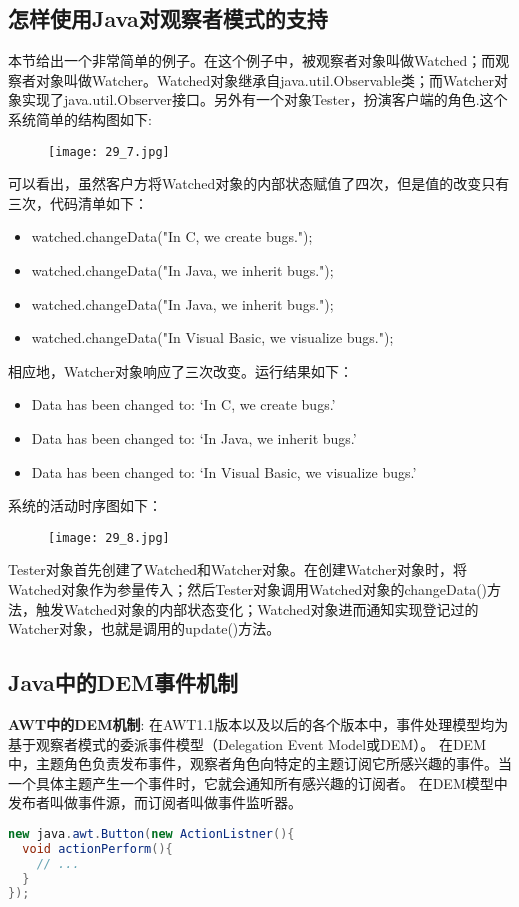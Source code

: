 \documentclass[../main.tex]{subfiles}
\begin{document}
\subsection{怎样使用Java对观察者模式的支持}
本节给出一个非常简单的例子。在这个例子中，被观察者对象叫做Watched；而观察者对象叫做Watcher。Watched对象继承自java.util.Observable类；而Watcher对象实现了java.util.Observer接口。另外有一个对象Tester，扮演客户端的角色.这个系统简单的结构图如下:
%
\begin{figure}[H]
  \texttt{[image: 29\_7.jpg]}
\end{figure}
%



%
可以看出，虽然客户方将Watched对象的内部状态赋值了四次，但是值的改变只有三次，代码清单如下：
%
\begin{itemize}
  \item watched.changeData("In C, we create bugs.");
  \item watched.changeData("In Java, we inherit bugs.");
  \item watched.changeData("In Java, we inherit bugs.");
  \item watched.changeData("In Visual Basic, we visualize bugs.");
\end{itemize}
%
相应地，Watcher对象响应了三次改变。运行结果如下：
%
\begin{itemize}
  \item Data has been changed to: ‘In C, we create bugs.’
  \item Data has been changed to: ‘In Java, we inherit bugs.’
  \item Data has been changed to: ‘In Visual Basic, we visualize bugs.’
\end{itemize}
%
系统的活动时序图如下：
%
\begin{figure}[H]
  \texttt{[image: 29\_8.jpg]}
\end{figure}
%
Tester对象首先创建了Watched和Watcher对象。在创建Watcher对象时，将Watched对象作为参量传入；然后Tester对象调用Watched对象的changeData()方法，触发Watched对象的内部状态变化；Watched对象进而通知实现登记过的Watcher对象，也就是调用的update()方法。
%
\subsection{Java中的DEM事件机制}
\textbf{AWT中的DEM机制}:
在AWT1.1版本以及以后的各个版本中，事件处理模型均为基于观察者模式的委派事件模型（Delegation Event Model或DEM）。
在DEM中，主题角色负责发布事件，观察者角色向特定的主题订阅它所感兴趣的事件。当一个具体主题产生一个事件时，它就会通知所有感兴趣的订阅者。
在DEM模型中发布者叫做事件源，而订阅者叫做事件监听器。
%
\begin{lstlisting}[language=java]
new java.awt.Button(new ActionListner(){
  void actionPerform(){
    // ...
  }
});
\end{lstlisting}
%
\end{document}
